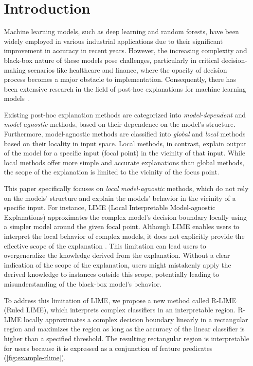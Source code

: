 \documentclass[runningheads]{llncs}
\begin{document}
\section{Introduction}
Machine learning models, such as deep learning and random forests,
have been widely employed in various industrial applications
due to their significant improvement in accuracy in recent years.
However,
the increasing complexity and black-box nature of these models pose challenges,
particularly in critical decision-making scenarios like healthcare and finance,
where the opacity of decision process becomes a major obstacle to
implementation.
Consequently,
there has been extensive research in the field of post-hoc explanations
for machine learning models~\cite{%
	guidotti2018local,radulovic2023bella,ribeiro2016why,ribeiro2018anchors}.

Existing post-hoc explanation methods are categorized
into \emph{model-dependent} and \emph{model-agnostic} methods,
based on their dependence on the model's structure.
Furthermore, model-agnostic methods are classified into
\emph{global} and \emph{local} methods based on their locality in input space.
Local methods, in contrast, explain output of the model for a specific input
(focal point) in the vicinity of that input.
While local methods offer more simple and accurate explanations
than global methods,
the scope of the explanation is limited to the vicinity of the focus point.

This paper specifically focuses on \emph{local} \emph{model-agnostic} methods,
which do not rely on the models' structure
and explain the models' behavior in the vicinity of a specific input.
For instance, LIME (Local Interpretable Model-agnostic Explanations)
\cite{ribeiro2016why} approximates the complex model's decision boundary
locally using a simpler model around the given focal point.
Although LIME enables users to interpret the local behavior of complex models,
it does not explicitly provide the effective scope of the explanation
\cite{ribeiro2018anchors}.
This limitation can lead
users to overgeneralize the knowledge derived from the explanation.
Without a clear indication of the scope of the explanation,
users might mistakenly apply
the derived knowledge to instances outside this scope,
potentially leading to misunderstanding of the black-box model's behavior.

To address this limitation of LIME,
we propose a new method called R-LIME (Ruled LIME),
which interprets complex classifiers in an interpretable region.
R-LIME locally approximates a complex decision boundary linearly
in a rectangular region and maximizes the region
as long as the accuracy of the linear classifier is
higher than a specified threshold.
The resulting rectangular region is interpretable for users because it is
expressed as a conjunction of feature predicates (\cref{fig:example-rlime}).
\end{document}

